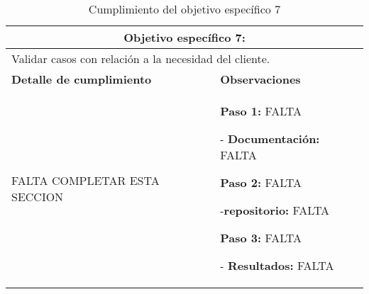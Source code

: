 \begin{table}[H]
\centering
\caption{Cumplimiento del objetivo específico 7}
\label{tab:cumplimiento-objetivo-7}
\begin{tabular}{|p{6cm}|p{9cm}|}
\hline
\multicolumn{2}{|c|}{\textbf{Objetivo específico 7:}} \\
\hline
\multicolumn{2}{|p{15cm}|}{Validar casos con relación a la necesidad del cliente.} \\
\hline
\textbf{Detalle de cumplimiento} & \textbf{Observaciones} \\
\hline
FALTA COMPLETAR ESTA SECCION &
\textbf{Paso 1:} FALTA

- \textbf{Documentación:} FALTA

\textbf{Paso 2:} FALTA

-\textbf{repositorio:} FALTA

\textbf{Paso 3:} FALTA

- \textbf{Resultados:} FALTA \\

\hline
\end{tabular}
\end{table}